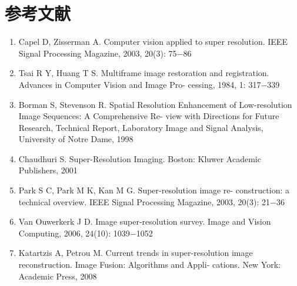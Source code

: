 \documentclass[]{article}
\begin{document}
    \section{参考文献}
    \begin{enumerate}[(1)]
        \item Capel D, Zisserman A. Computer vision applied to super
        resolution. IEEE Signal Processing Magazine, 2003, 20(3):
        75−86

        \item Tsai R Y, Huang T S. Multiframe image restoration and
        registration. Advances in Computer Vision and Image Pro-
        cessing, 1984, 1: 317−339

        \item Borman S, Stevenson R. Spatial Resolution Enhancement
        of Low-resolution Image Sequences: A Comprehensive Re-
        view with Directions for Future Research, Technical Report,
        Laboratory Image and Signal Analysis, University of Notre
        Dame, 1998

        \item Chaudhuri S. Super-Resolution Imaging. Boston: Kluwer
        Academic Publishers, 2001

        \item Park S C, Park M K, Kan M G. Super-resolution image re-
        construction: a technical overview. IEEE Signal Processing
        Magazine, 2003, 20(3): 21−36

        \item Van Ouwerkerk J D. Image super-resolution survey. Image
        and Vision Computing, 2006, 24(10): 1039−1052

        \item Katartzis A, Petrou M. Current trends in super-resolution
        image reconstruction. Image Fusion: Algorithms and Appli-
        cations. New York: Academic Press, 2008
    \end{enumerate}
    
\end{document}
